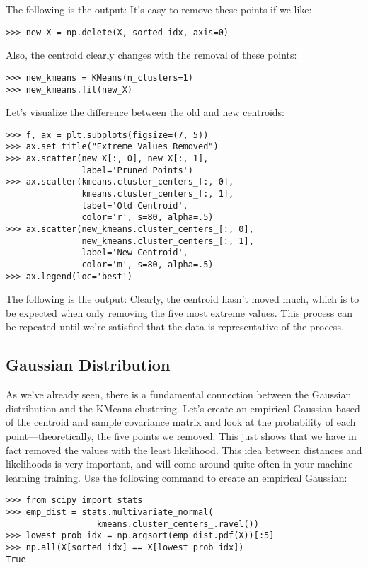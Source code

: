 \documentclass[SKL-MASTER.tex]{subfiles}
\begin{document}
The following is the output:
It's easy to remove these points if we like:
\begin{framed}
	\begin{verbatim}
>>> new_X = np.delete(X, sorted_idx, axis=0)
\end{verbatim}
\end{framed}
Also, the centroid clearly changes with the removal of these points:
\begin{framed}
	\begin{verbatim}
>>> new_kmeans = KMeans(n_clusters=1)
>>> new_kmeans.fit(new_X)
\end{verbatim}
\end{framed}
Let's visualize the difference between the old and new centroids:
\begin{framed}
\begin{verbatim}
>>> f, ax = plt.subplots(figsize=(7, 5))
>>> ax.set_title("Extreme Values Removed")
>>> ax.scatter(new_X[:, 0], new_X[:, 1], 
               label='Pruned Points')
>>> ax.scatter(kmeans.cluster_centers_[:, 0],
               kmeans.cluster_centers_[:, 1], 
               label='Old Centroid',
               color='r', s=80, alpha=.5)
>>> ax.scatter(new_kmeans.cluster_centers_[:, 0],
               new_kmeans.cluster_centers_[:, 1], 
               label='New Centroid',
               color='m', s=80, alpha=.5)
>>> ax.legend(loc='best')
\end{verbatim}
\end{framed}
The following is the output:
Clearly, the centroid hasn't moved much, which is to be expected when only removing the
five most extreme values. This process can be repeated until we're satisfied that the data
is representative of the process.
\subsection*{Gaussian Distribution}
As we've already seen, there is a fundamental connection between the Gaussian distribution
and the KMeans clustering. Let's create an empirical Gaussian based of the centroid and
sample covariance matrix and look at the probability of each point—theoretically, the five
points we removed. This just shows that we have in fact removed the values with the least
likelihood. This idea between distances and likelihoods is very important, and will come
around quite often in your machine learning training.
Use the following command to create an empirical Gaussian:
\begin{framed}
	\begin{verbatim}
>>> from scipy import stats
>>> emp_dist = stats.multivariate_normal(
                  kmeans.cluster_centers_.ravel())
>>> lowest_prob_idx = np.argsort(emp_dist.pdf(X))[:5]
>>> np.all(X[sorted_idx] == X[lowest_prob_idx])
True
\end{verbatim}
\end{framed}
\end{document}
